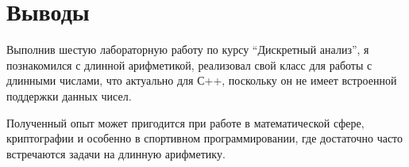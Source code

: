 \section{Выводы}

Выполнив шестую лабораторную работу по курсу \enquote{Дискретный анализ}, я познакомился с длинной арифметикой, реализовал свой класс для работы с длинными числами, что актуально для С++, поскольку он не имеет встроенной поддержки данных чисел. 

Полученный опыт может пригодится при работе в математической сфере, криптографии и особенно в спортивном программировании, где достаточно часто встречаются задачи на длинную арифметику.
\pagebreak
